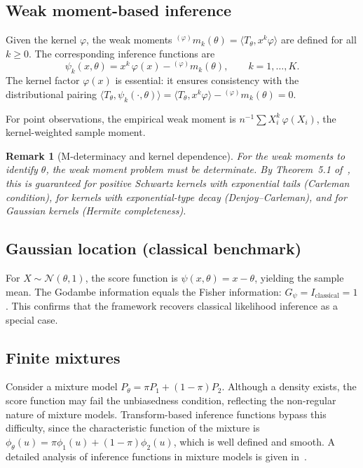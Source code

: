 \documentclass[11pt,a4paper]{article}
\newtheorem{remark}[theorem]{Remark}
\begin{document}
\subsection{Weak moment-based inference}\label{subsec:weak-moment}

Given the kernel $\varphi$, the weak moments
${}^{(\varphi)}m_k(\theta) = \langle T_\theta, x^k\varphi \rangle$ are
defined for all $k \geq 0$.  The corresponding inference functions are
\[
\psi_k(x, \theta) = x^k\,\varphi(x) - {}^{(\varphi)}m_k(\theta),
\qquad k = 1, \ldots, K.
\]
The kernel factor $\varphi(x)$ is essential: it ensures consistency with the
distributional pairing
$\langle T_\theta, \psi_k(\cdot, \theta) \rangle
= \langle T_\theta, x^k\varphi \rangle - {}^{(\varphi)}m_k(\theta) = 0$.

For point observations, the empirical weak moment is
$n^{-1}\sum X_i^k\,\varphi(X_i)$, the kernel-weighted sample moment.

\begin{remark}[M-determinacy and kernel dependence]\label{rem:M-det}
For the weak moments to identify $\theta$, the weak moment problem must be
determinate.  By Theorem~5.1 of~\cite{LabouriauA1}, this is guaranteed for
positive Schwartz kernels with exponential tails (Carleman condition),
for kernels with exponential-type decay (Denjoy--Carleman), and for
Gaussian kernels (Hermite completeness).
\end{remark}

\subsection{Gaussian location (classical benchmark)}\label{subsec:gaussian}

For $X \sim \mathcal N(\theta, 1)$, the score function is
$\psi(x, \theta) = x - \theta$, yielding the sample mean.  The Godambe
information equals the Fisher information:
$G_\psi = I_{\mathrm{classical}} = 1$.  This confirms that the framework
recovers classical likelihood inference as a special case.

\subsection{Finite mixtures}\label{subsec:mixtures}

Consider a mixture model
$P_\theta = \pi P_1 + (1 - \pi) P_2$.  Although a density exists, the
score function may fail the unbiasedness condition, reflecting the
non-regular nature of mixture models.  Transform-based inference functions
bypass this difficulty, since the characteristic function of the mixture is
$\phi_\theta(u) = \pi\phi_1(u) + (1-\pi)\phi_2(u)$, which is well defined
and smooth.  A detailed analysis of inference functions in mixture models is
given in~\cite{Labouriau2022}.
\end{document}
